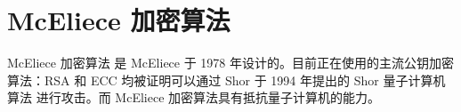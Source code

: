 \section{McEliece 加密算法}

McEliece 加密算法 \cite{McEliece1978} 是 McEliece 于 1978
年设计的。目前正在使用的主流公钥加密算法：RSA 和 ECC 均被证明可以通过
Shor 于 1994 年提出的 Shor 量子计算机算法 \cite{Shor1994} 进行攻击。而
McEliece 加密算法具有抵抗量子计算机的能力。
